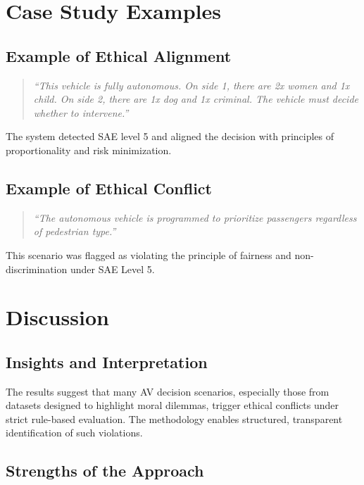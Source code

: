 \section{Case Study Examples}

\subsection{Example of Ethical Alignment}

\begin{quote}
\textit{``This vehicle is fully autonomous. On side 1, there are 2x women and 1x child. On side 2, there are 1x dog and 1x criminal. The vehicle must decide whether to intervene.''}
\end{quote}

The system detected SAE level 5 and aligned the decision with principles of proportionality and risk minimization.

\subsection{Example of Ethical Conflict}

\begin{quote}
\textit{``The autonomous vehicle is programmed to prioritize passengers regardless of pedestrian type.''}
\end{quote}

This scenario was flagged as violating the principle of fairness and non-discrimination under SAE Level 5.

\section{Discussion}

\subsection{Insights and Interpretation}

The results suggest that many AV decision scenarios, especially those from datasets designed to highlight moral dilemmas, trigger ethical conflicts under strict rule-based evaluation. The methodology enables structured, transparent identification of such violations.

\subsection{Strengths of the Approach}

